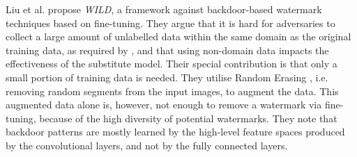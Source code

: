 Liu et al. \cite{liu_removing_2020} propose \textit{WILD}, a framework against backdoor-based watermark techniques based on fine-tuning.
They argue that it is hard for adversaries to collect a large amount of unlabelled data within the same domain as the original training data, as required by \cite{shafieinejad_robustness_2019}, and that using non-domain data impacts the effectiveness of the substitute model.
Their special contribution is that only a small portion of training data is needed. They utilise Random Erasing \cite{zhong_random_2020}, i.e. removing random segments from the input images, to augment the data. %
This augmented data alone is, however, not enough to remove a watermark via fine-tuning, because of the high diversity of potential watermarks. They note that backdoor patterns are mostly learned by the high-level feature spaces produced by the convolutional layers, and not by the fully connected layers.
